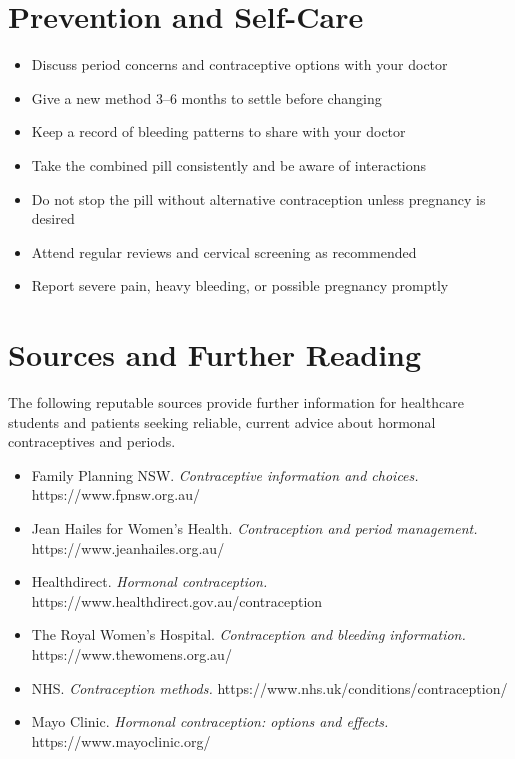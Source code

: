 \section*{Prevention and Self-Care}
\begin{itemize}
    \item Discuss period concerns and contraceptive options with your doctor
    \item Give a new method 3--6 months to settle before changing
    \item Keep a record of bleeding patterns to share with your doctor
    \item Take the combined pill consistently and be aware of interactions
    \item Do not stop the pill without alternative contraception unless pregnancy is desired
    \item Attend regular reviews and cervical screening as recommended
    \item Report severe pain, heavy bleeding, or possible pregnancy promptly
\end{itemize}

\section*{Sources and Further Reading}
The following reputable sources provide further information for healthcare students and patients seeking reliable, current advice about hormonal contraceptives and periods.

\begin{itemize}
    \item Family Planning NSW. \textit{Contraceptive information and choices.} https://www.fpnsw.org.au/
    \item Jean Hailes for Women's Health. \textit{Contraception and period management.} https://www.jeanhailes.org.au/
    \item Healthdirect. \textit{Hormonal contraception.} https://www.healthdirect.gov.au/contraception
    \item The Royal Women's Hospital. \textit{Contraception and bleeding information.} https://www.thewomens.org.au/
    \item NHS. \textit{Contraception methods.} https://www.nhs.uk/conditions/contraception/
    \item Mayo Clinic. \textit{Hormonal contraception: options and effects.} https://www.mayoclinic.org/
\end{itemize}
